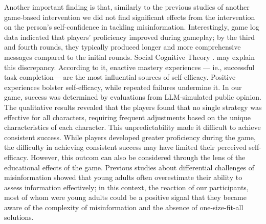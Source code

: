 Another important finding is that, similarly to the previous studies of another game-based intervention \cite{leder2024feedback} we did not find significant effects from the intervention on the person's self-confidence in tackling misinformation.
Interestingly, game log data indicated that players' proficiency improved during gameplay; by the third and fourth rounds, they typically produced longer and more comprehensive messages compared to the initial rounds. Social Cognitive Theory \cite{bandura1997self}. may explain this discrepancy. According to it, enactive mastery experiences — ie., successful task completion— are the most influential sources of self-efficacy\cite{bandura1997self}. Positive experiences bolster self-efficacy, while repeated failures undermine it. In our game, success was determined by evaluations from LLM-simulated public opinion. The qualitative results revealed that the players found that no single strategy was effective for all characters, requiring frequent adjustments based on the unique characteristics of each character. This unpredictability made it difficult to achieve consistent success. While players developed greater proficiency during the game, the difficulty in achieving consistent success may have limited their perceived self-efficacy. However, this outcom can also be considered through the lens of the educational effects of the game. Previous studies about differential challenges of misinformation showed that young adults %
often overestimate their ability to assess information effectively\cite{papapicco2022adolescents,porat2018measuring}; in this context, the reaction of our participants, most of whom were young adults could be a positive signal that they became aware of the complexity of misinformation and the absence of one-size-fit-all solutions. 

